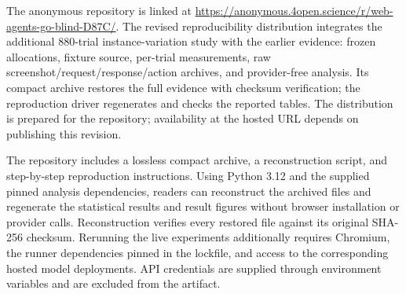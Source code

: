 \documentclass{article}
\begin{document}
The anonymous repository is linked at \url{https://anonymous.4open.science/r/web-agents-go-blind-D87C/}. The revised reproducibility distribution integrates the additional 880-trial instance-variation study with the earlier evidence: frozen allocations, fixture source, per-trial measurements, raw screenshot/request/response/action archives, and provider-free analysis. Its compact archive restores the full evidence with checksum verification; the reproduction driver regenerates and checks the reported tables. The distribution is prepared for the repository; availability at the hosted URL depends on publishing this revision.

The repository includes a lossless compact archive, a reconstruction script, and step-by-step reproduction instructions. Using Python 3.12 and the supplied pinned analysis dependencies, readers can reconstruct the archived files and regenerate the statistical results and result figures without browser installation or provider calls. Reconstruction verifies every restored file against its original SHA-256 checksum. Rerunning the live experiments additionally requires Chromium, the runner dependencies pinned in the lockfile, and access to the corresponding hosted model deployments. API credentials are supplied through environment variables and are excluded from the artifact.
\end{document}
